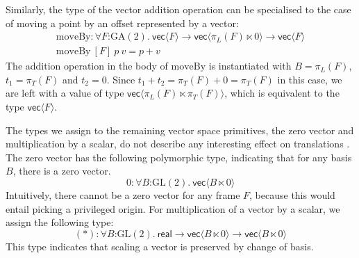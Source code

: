 \documentclass{article}
\newcommand{\GA}{\mathrm{GA}}
\newcommand{\GL}{\mathrm{GL}}
\begin{document}
Similarly, the type of the vector addition operation can be
specialised to the case of moving a point by an offset represented by
a vector:
\begin{displaymath}
  \begin{array}{l}
    \mathrm{moveBy} : \forall F \mathord:\GA(2).\ \mathsf{vec}\langle F \rangle \to \mathsf{vec}\langle \pi_L(F) \ltimes 0 \rangle \to \mathsf{vec}\langle F \rangle \\
    \mathrm{moveBy}\ [F]\ p\ v = p + v
  \end{array}
\end{displaymath}
The addition operation in the body of $\mathrm{moveBy}$ is
instantiated with $B = \pi_L(F)$, $t_1 = \pi_T(F)$ and $t_2 =
0$. Since $t_1 + t_2 = \pi_T(F) + 0 = \pi_T(F)$ in this case, we are
left with a value of type $\mathsf{vec}\langle \pi_L(F) \ltimes
\pi_T(F) \rangle$, which is equivalent to the type
$\mathsf{vec}\langle F \rangle$.

The types we assign to the remaining vector space primitives, the zero
vector and multiplication by a scalar, do not describe any interesting
effect on translations%
. The zero vector has the following polymorphic type, indicating that
for any basis $B$, there is a zero vector.
\begin{displaymath}
  \mathrm{0} : \forall B \mathord: \GL(2).\ \mathsf{vec}\langle B \ltimes 0 \rangle
\end{displaymath}
Intuitively, there cannot be a zero vector for any frame $F$, because
this would entail picking a privileged origin. For multiplication of a
vector by a scalar, we assign the following type:
\begin{displaymath}
  (*) : \forall B \mathord: \GL(2).\ \mathsf{real} \to \mathsf{vec}\langle B \ltimes 0 \rangle \to \mathsf{vec}\langle B \ltimes 0 \rangle
\end{displaymath}
This type indicates that scaling a vector is preserved by change of
basis.
\end{document}

